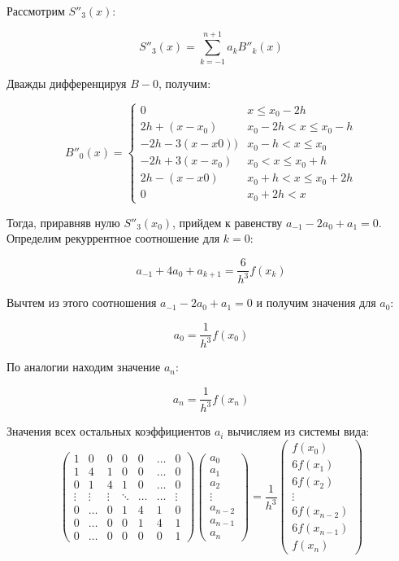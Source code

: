 \documentclass[12pt]{article}
\begin{document}
	Рассмотрим $S''_3(x)$:
		
		$$S''_3(x)=\sum\limits_{k=-1}^{n+1} a_k B''_k(x)$$	
	
	Дважды дифференцируя $B-0$, получим:
	
	$$B''_0(x)=
		\begin{cases}
			0 											& x \leq x_0-2h \\
			2h+(x-x_0)			 						& x_0-2h < x \leq x_0-h \\
			-2h-3(x-x0))								 	& x_0-h < x \leq x_0 \\
			-2h+3(x-x_0)								 	& x_0 < x \leq x_0 + h \\
			2h-(x-x0)										& x_0+h < x \leq x_0 + 2h\\
    			0											& x_0 + 2h < x 
		\end{cases}
	$$
	
	Тогда, приравняв нулю $S''_3(x_0)$, прийдем к равенству $a_{-1}-2a_0+a_1=0$.
	Определим рекуррентное соотношение для $k=0$:
	
		$$a_{-1}+4a_0+a_{k+1}=\frac{6}{h^3}f(x_k)$$
	
	Вычтем из этого соотношения $a_{-1}-2a_0+a_1=0$ и получим значения для $a_0$:
	
		$$a_0=\frac{1}{h^3}f(x_0)$$
	
	По аналогии находим значение $a_n$:
	
		$$a_n=\frac{1}{h^3}f(x_n)$$
		
	Значения всех остальных коэффициентов $a_i$ вычисляем из системы вида:
\begin{equation*}
	\begin{pmatrix}
		1 & 0 & 0 & 0 & 0 & \dots & 0 \\
		1 & 4 & 1 & 0 & 0 & \dots & 0 \\
		0 & 1 & 4 & 1 & 0 & \dots & 0 \\
		\vdots & \vdots & \vdots & \ddots & \dots & \dots & \vdots \\
		0 & \dots & 0 & 1 & 4 & 1 & 0 \\
		0 & \dots & 0 & 0 & 1 & 4 & 1 \\
		0 & \dots & 0 & 0 & 0 & 0 & 1 
	\end{pmatrix}
	\begin{pmatrix}
		a_0 \\
		a_1 \\
		a_2 \\
		\vdots \\
		a_{n-2} \\
		a_{n-1} \\
		a_n
	\end{pmatrix}
	= \frac{1}{h^3}
	\begin{pmatrix}
		f(x_0) \\
		6f(x_1) \\
		6f(x_2) \\
		\vdots \\
		6f(x_{n-2}) \\
		6f(x_{n-1}) \\
		f(x_n)
	\end{pmatrix}
\end{equation*}
	
\end{document}
